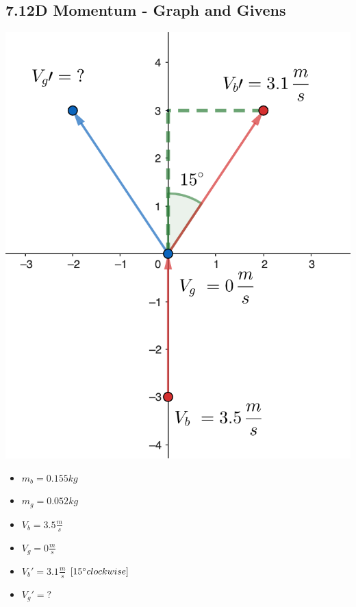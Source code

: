 \documentclass{article}
\begin{document}
\begin{adjustwidth}{1cm}{0pt}
    \subsection*{7.1\hspace*{0.5cm}2D Momentum - Graph and Givens}
    \begin{minipage}{0.5\textwidth}
        \includegraphics[scale=0.33]{./images/2d_momentum_graph}
    \end{minipage}
    \begin{minipage}{0.5\textwidth}
        \begin{itemize}
            \item $m_{b} = 0.155kg$
            \item $m_{g} = 0.052kg$
            \item $V_{b} = 3.5\frac{m}{s}$
            \item $V_{g} = 0\frac{m}{s}$
            \item $V_{b}\prime = 3.1\frac{m}{s}$ $[15\degree clockwise]$
            \item $V_{g}\prime = ?$
        \end{itemize}
    \end{minipage}

\end{adjustwidth}
\end{document}
